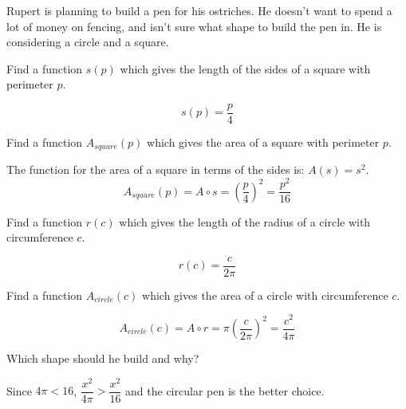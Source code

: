 \documentclass[fleqn,addpoints]{exam}
\begin{document}
\begin{questions}
Rupert is planning to build a pen for his ostriches.  He doesn't want to spend a lot of money on
fencing, and isn't sure what shape to build the pen in.  He is considering a circle and a square.

\begin{parts}

\bonuspart[2] Find a function $s(p)$ which gives the length of the sides of a square with perimeter $p$.
\begin{solution}[2 cm]
\[
  s(p) = \frac{p}{4}  
\]
\end{solution}

\bonuspart[3] Find a function $A_{square}(p)$ which gives the area of a square with perimeter $p$.
\begin{solution}[3 cm]
The function for the area of a square in terms of the sides is: $A(s) = s^2$.
\[
  A_{square}(p) = A \circ s = \left( \frac{p}{4} \right)^2 = \frac{p^2}{16}
\]
\end{solution}

\bonuspart[2] Find a function $r(c)$ which gives the length of the radius of a circle with circumference $c$.
\begin{solution}[3 cm]
\[
  r(c) = \frac{c}{2 \pi}  
\]
\end{solution}

\bonuspart[3] Find a function $A_{circle}(c)$ which gives the area of a circle with circumference $c$.
\begin{solution}[3 cm]
\[
    A_{circle}(c) = A \circ r = \pi \left( \frac{c}{2 \pi} \right)^2 = \frac{c^2}{4 \pi}
\]
\end{solution}

\bonuspart[5] \label{ostrich:best} Which shape should he build and why?
\begin{solution}[2 cm]
Since $4 \pi < 16$, $\dfrac{x^2}{4 \pi} > \dfrac{x^2}{16}$ and the circular pen is the better choice.
\end{solution}


\end{parts}


\end{questions}
\end{document}
